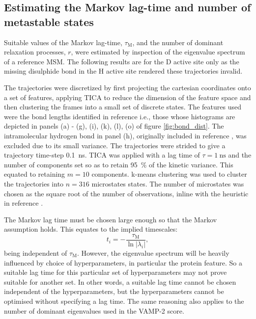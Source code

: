 \subsection{Estimating the Markov lag-time and number of metastable states}\label{sec:aadh_est_tau_k}

Suitable values of the Markov lag-time, $\tau_{\mathrm{M}}$, and  the number of dominant relaxation processes, $r$, were estimated by inspection of the eigenvalue spectrum of a reference MSM. The following results are for the D active site only as the missing disulphide bond in the H active site rendered these trajectories invalid.

The trajectories were discretized by first projecting the cartesian coordinates onto a set of features, applying TICA to reduce the dimension of the feature space and then clustering the frames into a small set of discrete states.  The features used were the bond lengths identified in reference \cite{ranaghanInitioQMMM2017} i.e., those whose histograms are depicted in panels (a) - (g), (i), (k), (l), (o) of figure \ref{fig:bond_dist}. The intramolecular hydrogen bond in panel (h), originally included in reference \cite{ranaghanInitioQMMM2017}, was excluded due to its small variance. The trajectories were strided to give a trajectory time-step \SI{0.1}{\nano\second}. TICA was applied with a lag time of $\tau=\SI{1}{\nano\second}$ and the number of components set so as to retain \SI{95}{\percent} of the kinetic variance. This equated to retaining $m=10$ components. k-means clustering was used to cluster the trajectories into $n = 316$ microstates states. The number of microstates was chosen as the square root of the number of observations, inline with the heuristic in reference  \cite{husicWardClusteringImproves2017a}. 

The Markov lag time must be chosen large enough so that the Markov assumption holds. This equates to the implied timescales:
\begin{equation*}
    t_{i}=-\frac{\tau_{\mathrm{M}}}{\ln{|\lambda_{i}|}}, 
\end{equation*} 
being independent of $\tau_{\mathrm{M}}$. However, the eigenvalue spectrum will be heavily influenced by choice of hyperparameters, in particular the protein feature. So a suitable lag time for this particular set of hyperparameters may not prove suitable for another set. In other words, a suitable lag time cannot be chosen independent of the hyperparameters, but the hyperparameters cannot be optimised without specifying a lag time. The same reasoning also applies to the number of dominant eigenvalues used in the VAMP-2 score. 

